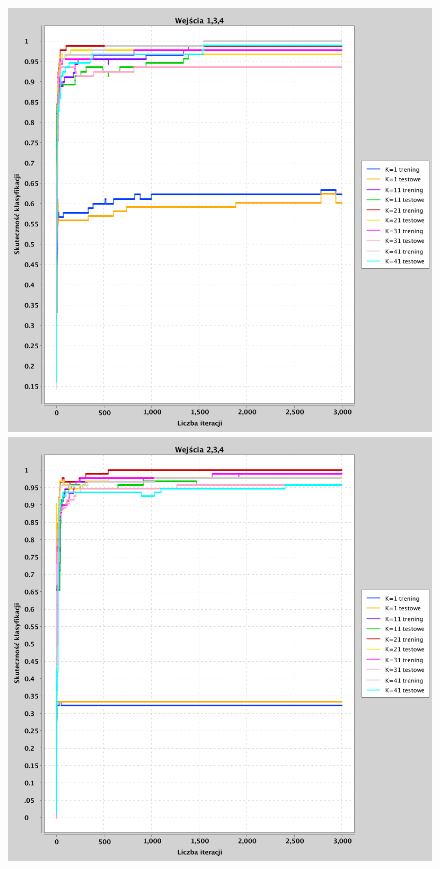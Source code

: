 \documentclass[a4paper, portrait,11pt]{article}
\begin{document}
\begin{figure}[!htb]
  \begin{minipage}{0.33\textwidth}
    \centering
    \includegraphics[width=1\linewidth]{../data/classification4/1/derivatives/3_1,3,4.png}
    \caption{\label{fig:41_3_1,3,4derivative}}
  \end{minipage}
  \begin{minipage}{0.33\textwidth}
    \centering
    \includegraphics[width=1\linewidth]{../data/classification4/1/derivatives/3_2,3,4.png}

\end{minipage}
\end{figure}
\end{document}
